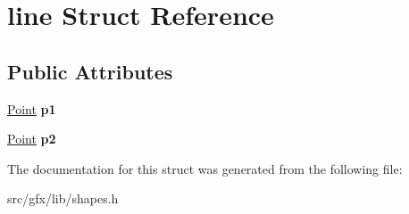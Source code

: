 \hypertarget{structline}{}\section{line Struct Reference}
\label{structline}
\subsection*{Public Attributes}
\begin{DoxyCompactItemize}
\item 
\mbox{\label{structline_ac4031f4171a4cf89c64db6003a8d17ca}} 
\hyperlink{structcoordinate}{Point} {\bfseries p1}
\item 
\mbox{\label{structline_a512b6973cb5e6962d6306efd9519bc57}} 
\hyperlink{structcoordinate}{Point} {\bfseries p2}
\end{DoxyCompactItemize}


The documentation for this struct was generated from the following file\+:\begin{DoxyCompactItemize}
\item 
src/gfx/lib/shapes.\+h\end{DoxyCompactItemize}
